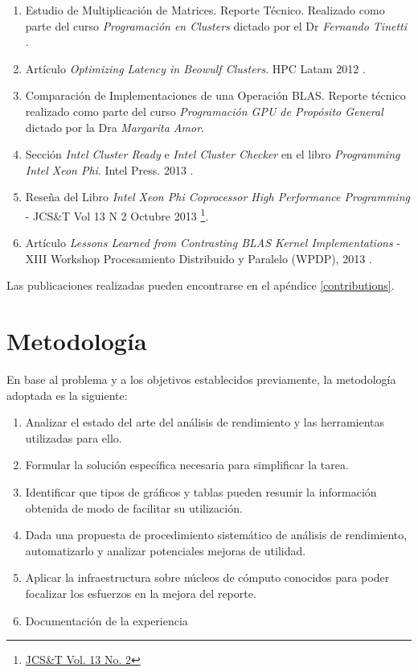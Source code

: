\documentclass[a4paper]{report}
\begin{document}
\begin{enumerate}
\item Estudio de Multiplicación de Matrices. Reporte Técnico. Realizado como parte del curso {\it Programación en Clusters} dictado por el Dr {\it Fernando Tinetti} \cite{mm-tool}.
\item Artículo {\it Optimizing Latency in Beowulf Clusters}. HPC Latam 2012 \cite{latency}.
\item Comparación de Implementaciones de una Operación BLAS. Reporte técnico realizado como parte del curso {\it Programación GPU de Propósito General} dictado por la Dra {\it Margarita Amor}.
\item Sección {\it Intel Cluster Ready} e {\it Intel Cluster Checker} en el libro {\it Programming Intel Xeon Phi}. Intel Press. 2013 \cite{xeonphi}.
\item Reseña del Libro {\it Intel Xeon Phi Coprocessor High Performance Programming} - JCS\&T Vol 13 N 2 Octubre 2013 \footnote{\href{http://journal.info.unlp.edu.ar/journal/journal36/papers/JCST-Oct13-BR1.pdf}{JCS\&T Vol. 13 No. 2}}.
\item Artículo {\it Lessons Learned from Contrasting BLAS Kernel Implementations} - XIII Workshop Procesamiento Distribuido y Paralelo (WPDP), 2013 \cite{lessons}.
\end{enumerate}

Las publicaciones realizadas pueden encontrarse en el apéndice \ref{contributions}.

\section{Metodología}

En base al problema y a los objetivos establecidos previamente, la metodología adoptada es la siguiente:

\begin{enumerate}
\item Analizar el estado del arte del análisis de rendimiento y las herramientas utilizadas para ello.
\item Formular la solución específica necesaria para simplificar la tarea.
\item Identificar que tipos de gráficos y tablas pueden resumir la información obtenida de modo de facilitar su utilización.
\item Dada una propuesta de procedimiento sistemático de análisis de rendimiento, automatizarlo y analizar potenciales mejoras de utilidad.
\item Aplicar la infraestructura sobre núcleos de cómputo conocidos para poder focalizar los esfuerzos en la mejora del reporte.
\item Documentación de la experiencia
\end{enumerate}
\end{document}
